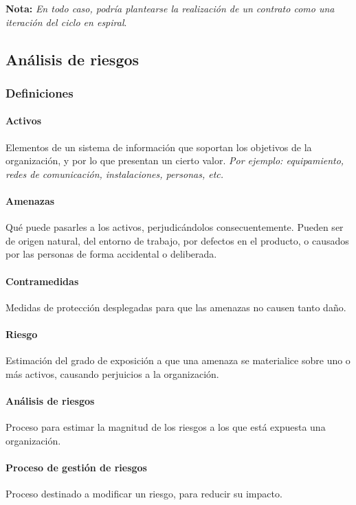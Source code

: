 \textbf{Nota:} \textit{En todo caso, podría plantearse la realización de un contrato como una iteración del ciclo en espiral}.


\subsection{Análisis de riesgos}

\subsubsection{Definiciones}

\paragraph{Activos} Elementos de un sistema de información que soportan los objetivos de la organización, y por lo que presentan un cierto valor. \textit{Por ejemplo: equipamiento, redes de comunicación, instalaciones, personas, etc.}

\paragraph{Amenazas} Qué puede pasarles a los activos, perjudicándolos consecuentemente. Pueden ser de origen natural, del entorno de trabajo, por defectos en el producto, o causados por las personas de forma accidental o deliberada.

\paragraph{Contramedidas} Medidas de protección desplegadas para que las amenazas no causen tanto daño.

\paragraph{Riesgo} Estimación del grado de exposición a que una amenaza se materialice sobre uno o más activos, causando perjuicios a la organización.

\paragraph{Análisis de riesgos} Proceso para estimar la magnitud de los riesgos a los que está expuesta una organización.

\paragraph{Proceso de gestión de riesgos} Proceso destinado a modificar un riesgo, para reducir su impacto.

